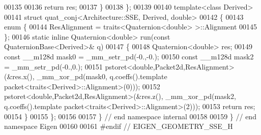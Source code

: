 \begin{DoxyCode}
00135 
00136   \textcolor{keywordflow}{return} res;
00137 \}
00138 \};
00139 
00140 \textcolor{keyword}{template}<\textcolor{keyword}{class} Derived>
00141 \textcolor{keyword}{struct }quat\_conj<Architecture::SSE, Derived, double>
00142 \{
00143   \textcolor{keyword}{enum} \{
00144     ResAlignment = traits<Quaternion<double> >::Alignment
00145   \};
00146   \textcolor{keyword}{static} \textcolor{keyword}{inline} Quaternion<double> run(\textcolor{keyword}{const} QuaternionBase<Derived>& q)
00147   \{
00148     Quaternion<double> res;
00149     \textcolor{keyword}{const} \_\_m128d mask0 = \_mm\_setr\_pd(-0.,-0.);
00150     \textcolor{keyword}{const} \_\_m128d mask2 = \_mm\_setr\_pd(-0.,0.);
00151     pstoret<double,Packet2d,ResAlignment>(&res.x(), \_mm\_xor\_pd(mask0, q.coeffs().template 
      packet<traits<Derived>::Alignment>(0)));
00152     pstoret<double,Packet2d,ResAlignment>(&res.z(), \_mm\_xor\_pd(mask2, q.coeffs().template 
      packet<traits<Derived>::Alignment>(2)));
00153     \textcolor{keywordflow}{return} res;
00154   \}
00155 \};
00156 
00157 \} \textcolor{comment}{// end namespace internal}
00158 
00159 \} \textcolor{comment}{// end namespace Eigen}
00160 
00161 \textcolor{preprocessor}{#endif // EIGEN\_GEOMETRY\_SSE\_H}
\end{DoxyCode}
